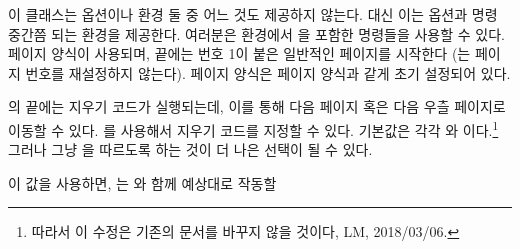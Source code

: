 이 클래스는  옵션이나  환경 둘 중 어느 것도
제공하지 않는다.
대신 이는  옵션과  명령 중간쯤 되는
 환경을 제공한다.
여러분은  환경에서 \cmd{\maketitle}을 포함한 명령들을 사용할
수 있다.
 페이지 양식이 사용되며, 끝에는 번호 1이 붙은 일반적인
페이지를 시작한다 (는 페이지 번호를 재설정하지 않는다).
 페이지 양식은  페이지 양식과 같게 초기
설정되어 있다.

의 끝에는 지우기 코드가 실행되는데, 이를 통해 다음 페이지 혹은
다음 우츨 페이지로 이동할 수 있다.
\cmd{\titlingpageend}를 사용해서
지우기 코드를 지정할 수 있다.
기본값은 각각 와 이다.\footnote{따라서 이
수정은 기존의 문서를 바꾸지 않을 것이다, LM, 2018/03/06.}
그러나 그냥 을 따르도록 하는 것이 더 나은 선택이 될 수
있다.
\begin{lcode}
  \titlingpageend{\clearforchapter}{\clearforchapter}
\end{lcode}
이 값을 사용하면, 는 와 함께 예상대로 작동할


